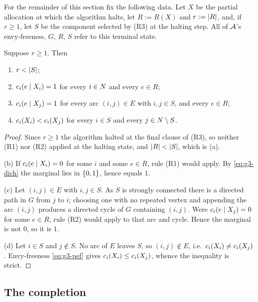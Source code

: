 For the remainder of this section fix the following data. Let $X$ be the
partial allocation at which the algorithm halts, let $R := R(X)$ and
$r := \left\lvert R\right\rvert$, and, if $r \ge 1$, let $S$ be the component selected by (R3)
at the halting step. All of $\mathcal{A}$'s envy-freeness, $G$, $R$, $S$ refer to
this terminal state.

\begin{lemma}
\label{lem:g3-terminal}
Suppose $r \ge 1$. Then
\begin{enumerate}
  \item[(a)] $r < \left\lvert S\right\rvert$;
  \item[(b)] $c_i(e \mid X_i) = 1$ for every $i \in N$ and every
        $e \in R$;
  \item[(c)] $c_i(e \mid X_j) = 1$ for every arc $(i,j) \in E$ with
        $i,j \in S$, and every $e \in R$;
  \item[(d)] $c_i(X_i) < c_i(X_j)$ for every $i \in S$ and every
        $j \in N \setminus S$.
\end{enumerate}
\end{lemma}
\begin{proof}
Since $r \ge 1$ the algorithm halted at the final clause of (R3), so neither
(R1) nor (R2) applied at the halting state, and $\left\lvert R\right\rvert < \left\lvert S\right\rvert$, which is
(a).

(b) If $c_i(e \mid X_i) = 0$ for some $i$ and some $e \in R$, rule (R1)
would apply. By \eqref{eq:g3-dich} the marginal lies in $\left\{0,1\right\}$, hence
equals $1$.

(c) Let $(i,j) \in E$ with $i,j \in S$. As $S$ is strongly connected there is
a directed path in $G$ from $j$ to $i$; choosing one with no repeated vertex
and appending the arc $(i,j)$ produces a directed cycle of $G$ containing
$(i,j)$. Were $c_i(e \mid X_j) = 0$ for some $e \in R$, rule (R2) would
apply to that arc and cycle. Hence the marginal is not $0$, so it is $1$.

(d) Let $i \in S$ and $j \notin S$. No arc of $E$ leaves $S$, so
$(i,j) \notin E$, i.e.\ $c_i(X_i) \ne c_i(X_j)$. Envy-freeness
\eqref{eq:g3-pef} gives $c_i(X_i) \le c_i(X_j)$, whence the
inequality is strict.
\end{proof}

\subsection{The completion}
\label{sec:g3-construction}

